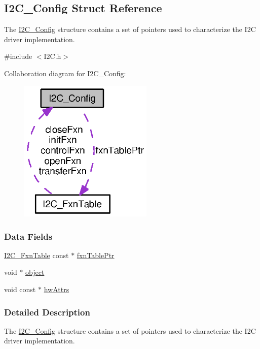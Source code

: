 \subsection{I2\-C\-\_\-\-Config Struct Reference}
\label{struct_i2_c___config}


The \hyperlink{struct_i2_c___config}{I2\-C\-\_\-\-Config} structure contains a set of pointers used to characterize the I2\-C driver implementation.  




{\ttfamily \#include $<$I2\-C.\-h$>$}



Collaboration diagram for I2\-C\-\_\-\-Config\-:
\nopagebreak
\begin{figure}[H]
\begin{center}
\leavevmode
\includegraphics[width=181pt]{struct_i2_c___config__coll__graph}
\end{center}
\end{figure}
\subsubsection*{Data Fields}
\begin{DoxyCompactItemize}
\item 
\hyperlink{struct_i2_c___fxn_table}{I2\-C\-\_\-\-Fxn\-Table} const $\ast$ \hyperlink{struct_i2_c___config_a225800ca2923178397645d520bc6a0c1}{fxn\-Table\-Ptr}
\item 
void $\ast$ \hyperlink{struct_i2_c___config_abeb7af699744bd43dc1fc5019073fd2c}{object}
\item 
void const $\ast$ \hyperlink{struct_i2_c___config_a1c623e253c0d5f896ad8037635f0c719}{hw\-Attrs}
\end{DoxyCompactItemize}


\subsubsection{Detailed Description}
The \hyperlink{struct_i2_c___config}{I2\-C\-\_\-\-Config} structure contains a set of pointers used to characterize the I2\-C driver implementation. 


